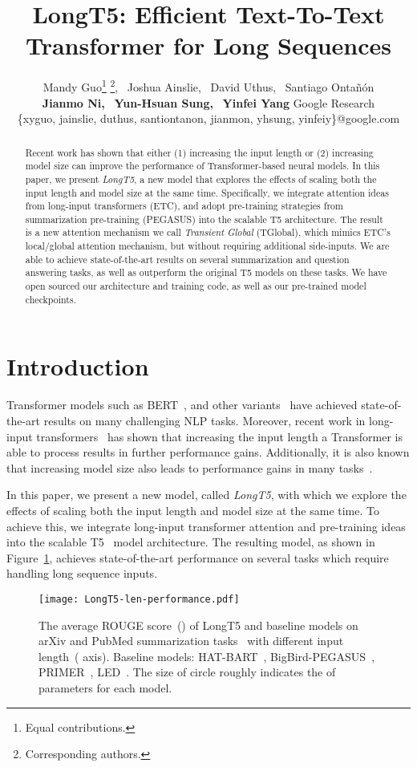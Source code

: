 \documentclass[11pt]{article}
\title{LongT5: Efficient Text-To-Text Transformer for Long Sequences}
\author{Mandy Guo\thanks{\hspace{2mm}Equal contributions.} \thanks{\hspace{2mm} Corresponding authors.},~
Joshua Ainslie\footnotemark[1]    \footnotemark[2],~
David Uthus\footnotemark[1],~ Santiago Onta\~{n}\'{o}n\footnotemark[1]\\
{\bf Jianmo Ni,}~
{\bf Yun{-}Hsuan Sung,}~
{\bf Yinfei Yang}
  \AND
  {\rm Google Research}\\
 \{xyguo, jainslie, duthus, santiontanon, jianmon, yhsung, yinfeiy\}@google.com
}
\begin{document}
\maketitle
\begin{abstract}
Recent work has shown that either (1) increasing the input length or (2) increasing model size can improve the performance of Transformer-based neural models. In this paper, we present {\em LongT5}, a new model that explores the effects of scaling both the input length and model size at the same time. 
Specifically, we integrate attention ideas from long-input transformers (ETC), and adopt pre-training strategies from summarization pre-training (PEGASUS) into the scalable T5 architecture. The result is a new attention mechanism we call {\em Transient Global} (TGlobal), which mimics ETC's local/global attention mechanism, but without requiring additional side-inputs. We are able to achieve state-of-the-art results on several summarization and question answering tasks, as well as outperform the original T5 models on these tasks. We have open sourced our architecture and training code, as well as our pre-trained model checkpoints.
\end{abstract}

\section{Introduction}

Transformer models such as BERT~\cite{devlin-etal-2019-bert}, and other variants~\cite{liu2019roberta,Radford2019LanguageMA,t5,lewis-etal-2020-bart} have achieved state-of-the-art results on many challenging NLP tasks. 
Moreover, recent work in long-input transformers~\cite{etc,zaheer2020,Beltagy2020Longformer,tay2021long} has shown that increasing the input length a Transformer is able to process results in further performance gains. Additionally, it is also known that increasing model size also leads to performance gains in many tasks~\cite{kaplan2020scaling}. 

In this paper, we present a new model, called {\em LongT5}, with which we explore the effects of scaling both the input length and model size at the same time.
To achieve this, we integrate long-input transformer attention and pre-training ideas into the scalable T5~\cite{t5} model architecture.
The resulting model, as shown in Figure~\ref{fig:gtr_avg}, achieves state-of-the-art performance on several tasks which require handling long sequence inputs.

\begin{figure}[t]
  \centering
  \texttt{[image: LongT5-len-performance.pdf]}
  \caption{The average ROUGE score~() of LongT5 and baseline models on arXiv and PubMed summarization tasks~\cite{cohan-etal-2018-discourse} with different input length~( axis). Baseline models: HAT-BART~\cite{rohde2021hierarchical}, BigBird-PEGASUS~\cite{zaheer2020}, PRIMER~\cite{xiao2021primer}, LED~\cite{Beltagy2020Longformer}. The size of circle roughly indicates the  of parameters for each model.
  }
  \label{fig:gtr_avg}
\end{figure}
\end{document}
